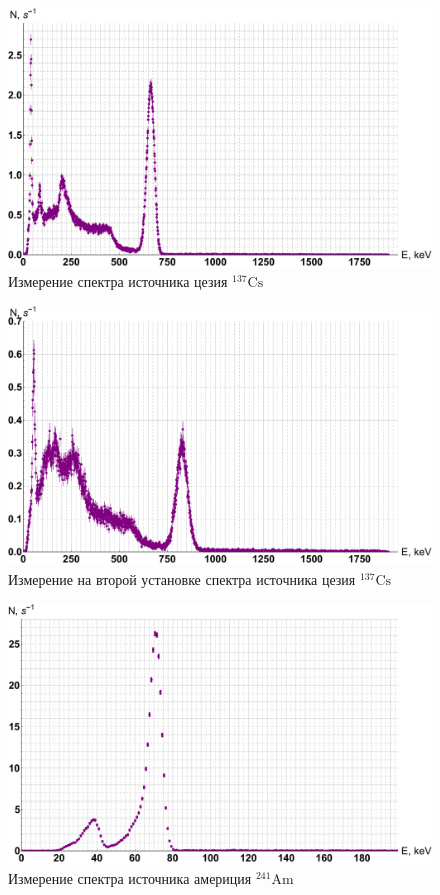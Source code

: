 \documentclass[12pt]{kiarticle}
\begin{document}
	\begin{figure}[H]
	\label{graf_cs}
	\includegraphics[scale=0.5]{cs.pdf}
	\caption{Измерение спектра источника цезия $ \mathrm{^{137}Cs} $}
\end{figure} 

\begin{figure}[H]
	\label{graf_cs2}
	\includegraphics[scale=0.5]{cs2.pdf}
	\caption{Измерение на второй установке спектра источника цезия $ \mathrm{^{137}Cs} $} 
\end{figure} 

\begin{figure}[H]
	\label{graf_am}
	\includegraphics[scale=0.5]{am.pdf}
	\caption{Измерение спектра источника америция $ \mathrm{^{241}Am} $}
\end{figure} 
\end{document}
